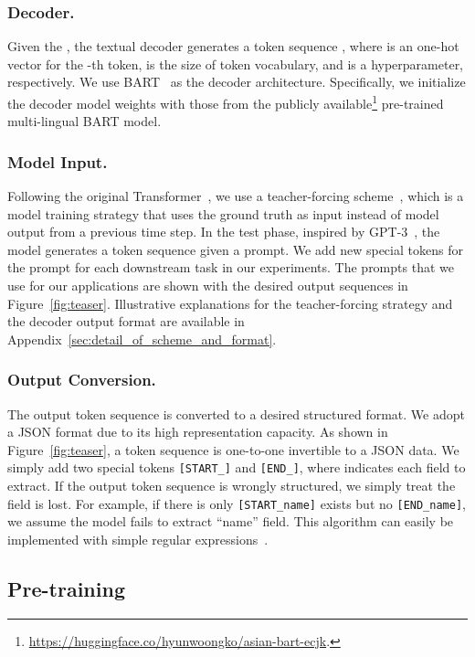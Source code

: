 \documentclass[runningheads]{llncs}
\begin{document}
\subsubsection{Decoder.}
Given the , the textual decoder generates a token sequence , where  is an one-hot vector for the -th token,  is the size of token vocabulary, and  is a hyperparameter, respectively.
We use BART~\cite{lewis-etal-2020-bart} as the decoder architecture.
Specifically, we initialize the decoder model weights with those from the publicly available\footnote{\url{https://huggingface.co/hyunwoongko/asian-bart-ecjk}.} pre-trained multi-lingual BART model\cite{liu-etal-2020}.


\subsubsection{Model Input.}
Following the original Transformer~\cite{vaswani2017transformer}, we use a teacher-forcing scheme~\cite{williams1989learning}, which is a model training strategy that uses the ground truth as input instead of model output from a previous time step.
In the test phase, inspired by GPT-3~\cite{NEURIPS2020_1457c0d6}, the model generates a token sequence given a prompt.
We add new special tokens for the prompt for each downstream task in our experiments.
The prompts that we use for our applications are shown with the desired output sequences in Figure~\ref{fig:teaser}.
Illustrative explanations for the teacher-forcing strategy and the decoder output format are available in Appendix~\ref{sec:detail_of_scheme_and_format}. 


\subsubsection{Output Conversion.}
The output token sequence is converted to a desired structured format.
We adopt a JSON format due to its high representation capacity.
As shown in Figure~\ref{fig:teaser}, a token sequence is one-to-one invertible to a JSON data.
We simply add two special tokens \texttt{\small [START\_]} and \texttt{\small [END\_]}, where  indicates each field to extract.
If the output token sequence is wrongly structured, we simply treat the field is lost. For example, if there is only \texttt{\small [START\_name]} exists but no \texttt{\small [END\_name]}, we assume the model fails to extract ``name'' field.
This algorithm can easily be implemented with simple regular expressions~\cite{Friedl06}.

\subsection{Pre-training} 
\end{document}

